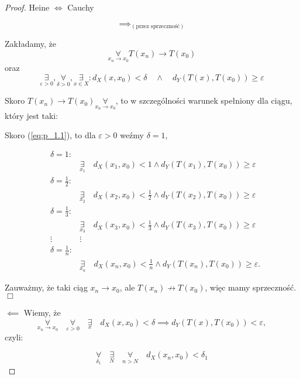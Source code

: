 \documentclass[../main.tex]{subfiles}
\begin{document}
\begin{proof}
    Heine $\iff$ Cauchy

    \[\implies_{(\text{przez sprzeczność})}\]

Zakładamy, że
    \[
        \underset{x_n \to x_0}{\forall} T(x_{n}) \to T(x_{0})
    \]
    oraz
    \begin{equation}
        \label{eq:p_1.1}
        \underset{\varepsilon > 0}{\exists}, \underset{\delta > 0}{\forall}, \underset{x\in X}{\exists} : d_{X} (x,x_{0}) < \delta \quad\land\quad d_{Y} (T(x),T(x_{0})) \geq \varepsilon
    \end{equation}

Skoro $T(x_{n})\to T(x_{0}) \underset{x_n \to x_0}{\forall}$, to w szczególności warunek spełniony dla ciągu, który jest taki:

    Skoro (\ref{eq:p_1.1}), to dla $\varepsilon>0$ weźmy $\delta = 1$,

\begin{align*}
    &\delta=1:\\
    &&\underset{x_1}{\exists} \quad d_{X} (x_{1},x_{0})<1 \land d_{Y} (T(x_{1}), T(x_{0})) \geq \varepsilon \\
    &\delta=\frac{1}{2}:\\
    &&\underset{x_2}{\exists} \quad d_{X} (x_{2},x_{0})<\frac{1}{2} \land d_{Y} (T(x_{2}), T(x_{0})) \geq \varepsilon \\
    &\delta=\frac{1}{3}:\\
    &&\underset{x_3}{\exists} \quad d_{X} (x_{3},x_{0})<\frac{1}{3} \land d_{Y} (T(x_{3}), T(x_{0})) \geq \varepsilon\\
    &\vdots &\vdots\\
    &\delta=\frac{1}{n}:\\
    &&\underset{x_n}{\exists} \quad d_{X}(x_{n},x_{0}) < \frac{1}{n} \land d_{Y} (T(x_{n}),T(x_{0})) \geq \varepsilon
.\end{align*}

Zauważmy, że taki ciąg $x_{n} \to x_{0}$, ale $T(x_{n}) \not\rightarrow T(x_{0})$, więc mamy sprzeczność. $\Box$

    $\impliedby$ Wiemy, że
    \begin{equation}
        \label{eq:p_1.2}
        \underset{x_n\to x_0}{\forall}\quad \underset{\varepsilon > 0}{\forall}\quad \underset{x}{\exists}\quad d_{X} (x,x_{0}) < \delta \implies d_{Y} (T(x),T(x_{0})) < \varepsilon
    ,
    \end{equation}
czyli:

\begin{equation}
    \label{eq:p_1.3}
    \underset{\delta_1}{\forall} \quad\underset{N}{\exists} \quad\underset{n>N}{\forall} \quad d_{X} (x_{n}, x_{0}) < \delta_{1}
\end{equation}


\end{proof}
\end{document}
